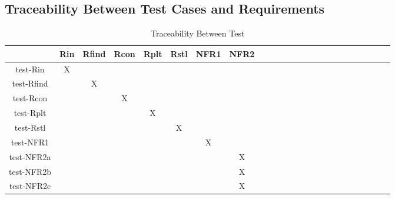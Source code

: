 \documentclass[12pt, titlepage]{article}
\begin{document}
\newpage
\subsection{Traceability Between Test Cases and Requirements}
\label{traceability}
\begin{table}[h]
	\centering
	\begin{tabular}{|c|c|c|c|c|c|c|c|c|c|c|c|c|c|c|c|c|c|c|c|c|c|c|c|}
		\hline        
		& Rin& Rfind & Rcon & Rplt & Rstl & NFR1 & NFR2 \\
		\hline
		test-Rin     &X & & & & & &  \\ \hline
		test-Rfind    & &X & & & & &  \\ \hline
		test-Rcon    & & &X & & & & \\ \hline 
		test-Rplt    & & & &X & & &   \\ \hline 
		test-Rstl    & & & & &X & &   \\ \hline 
		test-NFR1    & & & & & &X &   \\ \hline 
		test-NFR2a  & & & & & & &X   \\ \hline 
		test-NFR2b  & & & & & & &X   \\ \hline 
		test-NFR2c  & & & & & & &X \\
		\hline
	\end{tabular}\\
	\caption{Traceability Between Test }
	\label{Table:D_1}
\end{table} 
\end{document}
